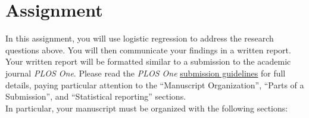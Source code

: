 \documentclass[11pt]{article}
\begin{document}
\section*{Assignment}

In this assignment, you will use logistic regression to address the research questions above. You will then communicate your findings in a written report. Your written report will be formatted similar to a submission to the academic journal \textit{PLOS One}. Please read the \textit{PLOS One} \href{https://journals.plos.org/plosone/s/submission-guidelines}{\underline{submission guidelines}} for full details, paying particular attention to the ``Manuscript Organization'', ``Parts of a Submission'', and ``Statistical reporting'' sections.\\

\noindent In particular, your manuscript must be organized with the following sections:
\end{document}
